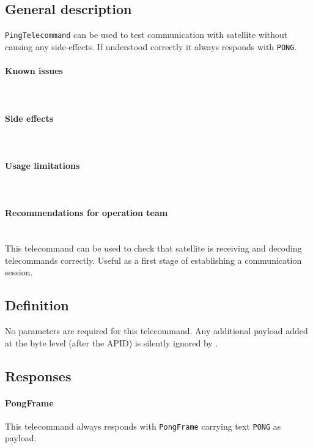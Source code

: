 

\subsection{General description}
\texttt{PingTelecommand} can be used to test communication with satellite without causing any side-effects. If understood correctly it always responds with \texttt{PONG}.

\paragraph{Known issues} \mbox{} \\
\None

\paragraph{Side effects} \mbox{} \\
\None

\paragraph{Usage limitations} \mbox{} \\
\None

\paragraph{Recommendations for operation team} \mbox{} \\
This telecommand can be used to check that satellite is receiving and decoding telecommands correctly. Useful as a first stage of establishing a communication session.

\subsection{Definition}

No parameters are required for this telecommand. Any additional payload added at the byte level (after the APID) is silently ignored by \OBC.

\subsection{Responses}

\paragraph{PongFrame}
This telecommand always responds with \texttt{PongFrame} carrying text \texttt{PONG} as payload.

